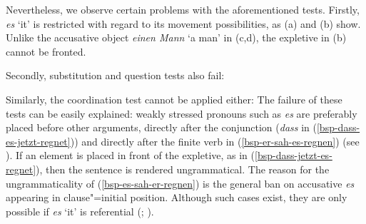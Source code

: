 \largerpage
Nevertheless, we observe certain problems with the aforementioned tests. Firstly, \emph{es} `it' is restricted
with regard to its movement possibilities, as (a) and (b) show.
\eal
{}
\zl
\eal
{}
\zl
Unlike the accusative object \emph{einen Mann} `a man' in (c,d), the expletive in (b) cannot
be fronted.

Secondly, substitution and question tests also fail:
\eal
{}
\zl

\noindent
Similarly, the coordination test cannot be applied either:
\z
The failure of these tests can be easily explained: weakly stressed pronouns such as \emph{es} are 
preferably placed before other arguments, directly after the conjunction (\emph{dass} in (\ref{bsp-dass-es-jetzt-regnet}))
and directly after the finite verb in (\ref{bsp-er-sah-es-regnen}) (see \citealp[]{Abraham95a-u}). If an element
is placed in front of the expletive, as in (\ref{bsp-dass-jetzt-es-regnet}), then the sentence is rendered ungrammatical.
The reason for the ungrammaticality of (\ref{bsp-es-sah-er-regnen}) is the general ban on accusative
\emph{es} appearing in clause"=initial position. Although such cases exist, they are only possible
if \emph{es} `it' is referential (\citealt[]{Lenerz94a};
\citealp[]{GS97a}).


